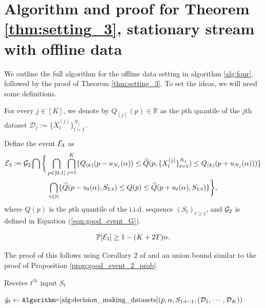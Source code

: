 \section{Algorithm and proof for Theorem \ref{thm:setting_3}, stationary stream with offline data}

We outline the full algorithm for the offline data setting in algorithm \ref{alg:four}, followed by the proof of Theorem \ref{thm:setting_3}.
To set the ideas, we will need some definitions. 

\begin{definition}
    For every $j \in [K]$, we denote by $Q_{(j)}(p) \in \mathbb{R}$ as the $p$th quantile of the $j$th dataset $\mathcal{D}_j := \{X_l^{(j)}\}_{l=1}^{N_j}$.
    \label{def:offline_quantile}
\end{definition}

\begin{definition} Define the event ${\mathcal{E}}_3$ as 
\begin{multline}
    {\mathcal{E}}_3 := {\mathcal{G}}_2 \bigcap \bigg\{\bigcap_{p \in [0,1]}\bigcap_{j=1}^{K} \{ Q_{(k)}(p-u_{N_j}(\alpha)) \leq \widehat{Q}(p, \{ X_l^{(j)} \}_{l=1}^{N_j} ) \leq  Q_{(k)}(p+u_{N_j}(\alpha)) ) \} \\\bigcap_{t \in \mathbb{N}} 
 \{  \widehat{Q}(p-u_t(\alpha), S_{1:t}) \leq Q(p) \leq \widehat{Q}(p+u_t(\alpha), S_{1:t}) \} \bigg\} ,
    \label{eqn:good_event_3}
\end{multline}
where $Q(p)$ is the $p$th quantile of the i.i.d. sequence $(S_t)_{t \geq 1}$, and ${\mathcal{G}}_2$ is defined in Equation (\ref{eqn:good_event_G}). 
\end{definition}

\begin{proposition}
    \begin{align*}
        \mathbb{P}[{\mathcal{E}}_3] \geq 1 - (K+2T)\alpha.
    \end{align*}
\end{proposition}
The proof of this follows using Corollary $2$ of \cite{howard2022sequential} and an union bound similar to the proof of Proposition \ref{prop:good_event_2_prob}.

\begin{algorithm}[h!]
\caption{Stationary stream with offline datasets}\label{alg:four}
 {
    Receive $t^{th}$ input $S_t$\;
    
    $\hat{y}_t \gets \text{{\ttfamily Algorithm-}\ref{alg:decision_making_datasets}} (p, \alpha, S_{1:t-1}, ({\mathcal{D}}_1, \cdots, {\mathcal{D}}_K))$
}
\end{algorithm}

